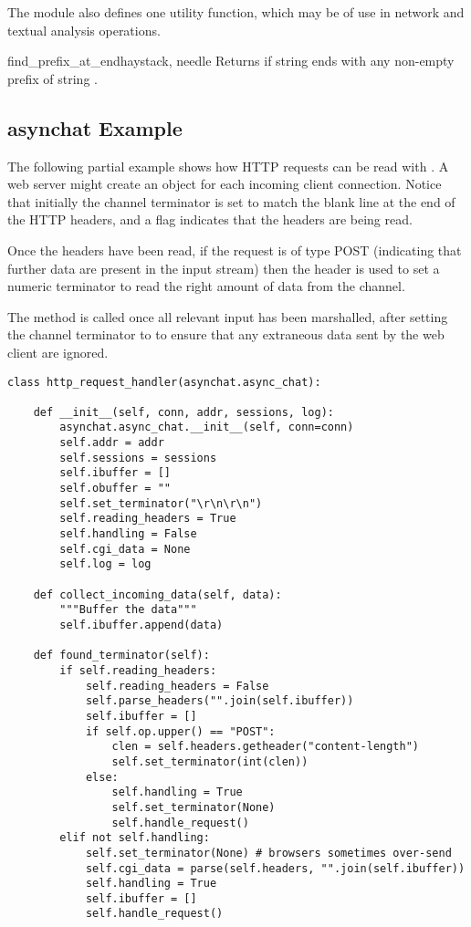 The  module also defines one utility function, which may be
of use in network and textual analysis operations.

\begin{funcdesc}{find_prefix_at_end}{haystack, needle}
  Returns  if string  ends with any non-empty
  prefix of string .
\end{funcdesc}

\subsection{asynchat Example \label{asynchat-example}}

The following partial example shows how HTTP requests can be read with
. A web server might create an  object for
each incoming client connection. Notice that initially the
channel terminator is set to match the blank line at the end of the HTTP
headers, and a flag indicates that the headers are being read.

Once the headers have been read, if the request is of type POST
(indicating that further data are present in the input stream) then the
 header is used to set a numeric terminator to
read the right amount of data from the channel.

The  method is called once all relevant input
has been marshalled, after setting the channel terminator to 
to ensure that any extraneous data sent by the web client are ignored.

\begin{verbatim}
class http_request_handler(asynchat.async_chat):

    def __init__(self, conn, addr, sessions, log):
        asynchat.async_chat.__init__(self, conn=conn)
        self.addr = addr
        self.sessions = sessions
        self.ibuffer = []
        self.obuffer = ""
        self.set_terminator("\r\n\r\n")
        self.reading_headers = True
        self.handling = False
        self.cgi_data = None
        self.log = log

    def collect_incoming_data(self, data):
        """Buffer the data"""
        self.ibuffer.append(data)

    def found_terminator(self):
        if self.reading_headers:
            self.reading_headers = False
            self.parse_headers("".join(self.ibuffer))
            self.ibuffer = []
            if self.op.upper() == "POST":
                clen = self.headers.getheader("content-length")
                self.set_terminator(int(clen))
            else:
                self.handling = True
                self.set_terminator(None)
                self.handle_request()
        elif not self.handling:
            self.set_terminator(None) # browsers sometimes over-send
            self.cgi_data = parse(self.headers, "".join(self.ibuffer))
            self.handling = True
            self.ibuffer = []
            self.handle_request()
\end{verbatim}

